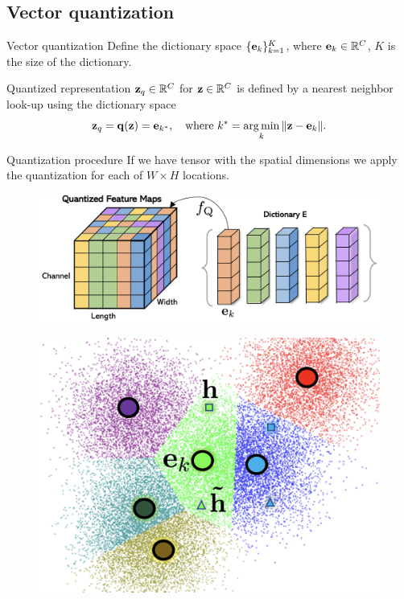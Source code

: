 \subsection{Vector quantization}
\begin{frame}{Vector quantization}
	Define the dictionary space $\{\mathbf{e}_k\}_{k=1}^K$, where $\mathbf{e}_k \in \mathbb{R}^C$, $K$ is the size of the dictionary.
	\begin{block}{Quantized representation}
		$\mathbf{z}_q \in \mathbb{R}^{C}$  for $\mathbf{z} \in \mathbb{R}^C$ is defined by a nearest neighbor look-up using the  dictionary space
		\vspace{-0.3cm}
		\[
		\mathbf{z}_q = \mathbf{q} (\mathbf{z}) = \mathbf{e}_{k^*}, \quad \text{where } k^* = \operatorname*{arg\,min}_k \| \mathbf{z} - \mathbf{e}_k \|.
		\] 
		\vspace{-0.7cm}
	\end{block}
	\vspace{-0.2cm}
	\begin{block}{Quantization procedure}
		If we have tensor with the spatial dimensions we apply the quantization for each of $W \times H$ locations.
		\begin{minipage}[t]{0.65\columnwidth}
			\begin{figure}
				\includegraphics[width=0.8\linewidth]{figs/fqgan_cnn.png}
			\end{figure}
		\end{minipage}%
		\begin{minipage}[t]{0.35\columnwidth}
			\begin{figure}
				\includegraphics[width=0.7\linewidth]{figs/fqgan_lookup}
			\end{figure}
		\end{minipage}
	\end{block}
\end{frame}
